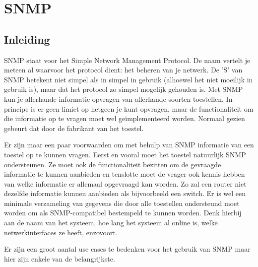 \chapter{SNMP}

\section{Inleiding}

SNMP staat voor het Simple Network Management Protocol. De naam vertelt je meteen al waarvoor het protocol dient: het beheren van je netwerk.
De 'S' van SNMP betekent niet simpel als in simpel in gebruik (alhoewel het niet moeilijk in gebruik is), maar dat het protocol zo simpel mogelijk gehouden is.
Met SNMP kun je allerhande informatie opvragen van allerhande soorten toestellen. In principe is er geen limiet op hetgeen je kunt opvragen,
maar de functionaliteit om die informatie op te vragen moet wel geïmplementeerd worden. Normaal gezien gebeurt dat door de fabrikant van het toestel.

Er zijn maar een paar voorwaarden om met behulp van SNMP informatie van een toestel op te kunnen vragen. Eerst en vooral moet het toestel natuurlijk SNMP ondersteunen.
Ze moet ook de functionaliteit bezitten om de gevraagde informatie te kunnen aanbieden en tenslotte moet de vrager ook kennis hebben van welke informatie
er allemaal opgevraagd kan worden. Zo zal een router niet dezelfde informatie kunnen aanbieden als bijvoorbeeld een switch. Er is wel een minimale
verzameling van gegevens die door alle toestellen ondersteund moet worden om als SNMP-compatibel bestempeld te kunnen worden. Denk hierbij aan de naam van het
systeem, hoe lang het systeem al online is, welke netwerkinterfaces ze heeft, enzovoort.

Er zijn een groot aantal use cases te bedenken voor het gebruik van SNMP maar hier zijn enkele van de belangrijkste.

